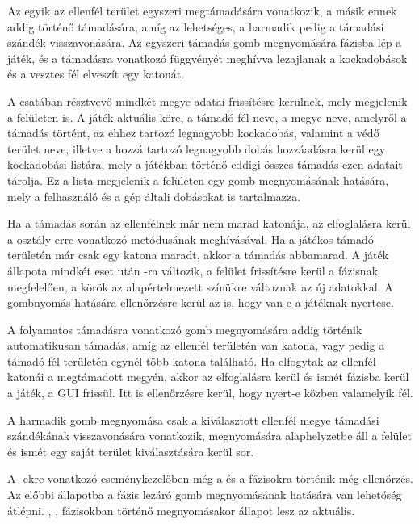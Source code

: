 Az egyik az ellenfél terület egyszeri megtámadására vonatkozik, a másik ennek addig történő támadására, amíg az lehetséges, a harmadik pedig a támadási szándék visszavonására.
Az egyszeri támadás gomb megnyomására  fázisba lép a játék, és a  támadásra vonatkozó függvényét meghívva lezajlanak a kockadobások és a vesztes fél elveszít egy katonát. 

A csatában résztvevő mindkét megye adatai frissítésre kerülnek, mely megjelenik a felületen is.
A játék aktuális köre, a támadó fél neve, a megye neve, amelyről a támadás történt, az ehhez tartozó legnagyobb kockadobás, valamint a védő terület neve, illetve a hozzá tartozó legnagyobb dobás hozzáadásra kerül egy kockadobási listára, mely a játékban történő eddigi összes támadás ezen adatait tárolja.
Ez a lista megjelenik a felületen egy gomb megnyomásának hatására, mely a felhasználó és a gép általi dobásokat is tartalmazza. 

Ha a támadás során az ellenfélnek már nem marad katonája, az elfoglalásra kerül a  osztály erre vonatkozó metódusának meghívásával.
Ha a játékos támadó területén már csak egy katona maradt, akkor a támadás abbamarad.
A játék állapota mindkét eset után -ra változik, a felület frissítésre kerül a fázisnak megfelelően, a körök az alapértelmezett színükre változnak az új adatokkal.
A gombnyomás hatására ellenőrzésre kerül az is, hogy van-e a játéknak nyertese. 

A folyamatos támadásra vonatkozó gomb megnyomására addig történik automatikusan támadás, amíg az ellenfél területén van katona, vagy pedig a támadó fél területén egynél több katona található.
Ha elfogytak az ellenfél katonái a megtámadott megyén, akkor az elfoglalásra kerül és ismét  fázisba kerül a játék, a GUI frissül.
Itt is ellenőrzésre kerül, hogy nyert-e közben valamelyik fél. 

A harmadik gomb megnyomása csak a kiválasztott ellenfél megye támadási szándékának visszavonására vonatkozik, megnyomására alaphelyzetbe áll a felület és ismét egy saját terület kiválasztására kerül sor. 

A -ekre vonatkozó eseménykezelőben még a  és a  fázisokra történik még ellenőrzés.
Az előbbi állapotba a fázis lezáró gomb megnyomásának hatására van lehetőség átlépni.
, ,  fázisokban történő megnyomásakor  állapot lesz az aktuális. 

